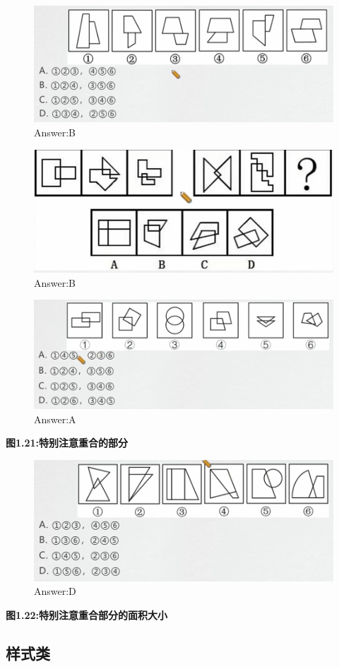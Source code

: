 \documentclass{article}
\numberwithin{equation}{section}						%
\numberwithin{figure}{section}							%
\begin{document}
\begin{sloppypar}
\begin{figure}[H]
     \centering
     \includegraphics[width=0.55\linewidth]{22.png}
		\caption{Answer:B}
\end{figure}


\begin{figure}[H]
     \centering
     \includegraphics[width=0.55\linewidth]{23.png}
		\caption{Answer:B}
\end{figure}

\begin{figure}[H]
     \centering
     \includegraphics[width=0.6\linewidth]{24.png}
		\caption{Answer:A}
\end{figure}

\textbf{图1.21:特别注意重合的部分}

\begin{figure}[H]
     \centering
     \includegraphics[width=0.6\linewidth]{25.png}
		\caption{Answer:D}
\end{figure}

\textbf{图1.22:特别注意重合部分的面积大小}

\newpage

\subsection{样式类}


\end{sloppypar}
\end{document}
